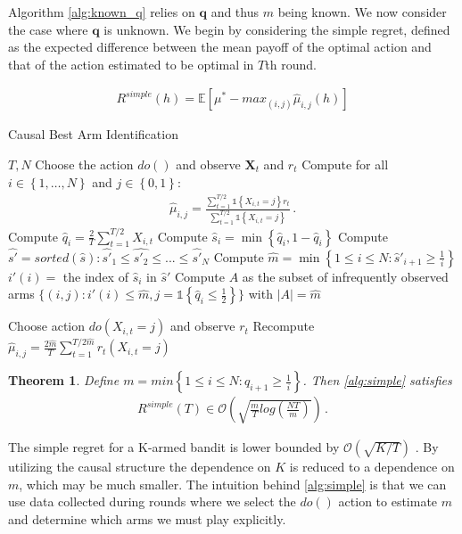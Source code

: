 \documentclass{article}
\newcommand{\E}[1]{\mathbb E\left[#1\right]}
\newcommand{\set}[1]{\left\{#1\right\}}
\newcommand{\ind}[1]{\mathds{1}\!\!\set{#1}}
\newcommand{\eqn}[1]{\begin{align}#1\end{align}}
\newcommand{\eq}[1]{\begin{align*}#1\end{align*}}
\newcommand{\bigo}[1]{\mathcal{O}\left( #1 \right)}
\theoremstyle{plain}
\newtheorem{theorem}{Theorem}
\theoremstyle{definition}
\begin{document}
Algorithm \ref{alg:known_q} relies on $\boldsymbol{q}$ and thus $m$ being known. We now consider the case where $\boldsymbol{q}$ is unknown. We begin by considering the simple regret, defined as the expected difference between the mean payoff of the optimal action and that of the action estimated to be optimal in $T$th round. 

\eqn{
R^{simple}(h) = \E{\mu^* - max_{(i,j)}\hat{\mu}_{i,j}(h)}
}

\begin{algorithm}[h]
\caption{Causal Best Arm Identification}\label{alg:simple}
\begin{algorithmic}[1]
 $T, N$
\STATE Choose the action $do()$ and observe $\boldsymbol{X}_t$ and $r_t$
\ENDFOR
\STATE Compute for all $i \in \set{1,\ldots,N}$ and $j \in \set{0,1}$:
\eq{
\hat \mu_{i,j} = \frac{\sum_{t=1}^{T/2} \ind{X_{i,t} = j} r_t}{\sum_{t=1}^{T/2} \ind{X_{i,t} = j}}\,.
}
\STATE Compute $\hat q_i = \frac{2}{T} \sum_{t=1}^{T/2} X_{i,t}$
\STATE Compute $\hat s_i = \min\set{\hat q_i, 1 - \hat q_i}$
\STATE Compute $\hat{s'} = sorted(\hat{s}) : \hat{s'}_1 \leq \hat{s'_2} \leq ... \leq \hat{s'}_N$
\STATE Compute $\hat m = \min\set{1 \leq i \leq N : \hat s'_{i+1} \geq \frac{1}{i}}$
\STATE $i'(i) = $ the index of $\hat s_i$ in $\hat s'$
\STATE Compute $A$ as the subset of infrequently observed arms $\{(i,j):i'(i) \leq \hat m, j = \ind{\hat q_{i} \leq \frac{1}{2}} \}$ with $|A| = \hat m$

\STATE Choose action $do(X_{i,t} = j)$ and observe $r_t$
\ENDFOR
\STATE Recompute $\hat \mu_{i,j} = \frac{2\hat m}{T} \sum_{t=1}^{ T/2\hat m} r_t(X_{i,t}=j)$ 
\ENDFOR
\end{algorithmic}
\end{algorithm}

\begin{theorem}\label{thm:unknown_q_simpleregret}
Define $m =   min\set{1 \leq i \leq N:q_{i+1} \geq \frac{1}{i}}$.
Then \cref{alg:simple} satisfies
\eq{
R^{simple}(T) \in \bigo{\sqrt{\frac{m}{T}log\left(\frac{NT}{m}\right)}}\,.
}
\end{theorem}

The simple regret for a K-armed bandit is lower bounded by $\bigo{\sqrt{K/T}}$ \cite{Bubeck2009}. By utilizing the causal structure the dependence on $K$ is reduced to a dependence on $m$, which may be much smaller. The intuition behind \cref{alg:simple} is that we can use data collected during rounds where we select the $do()$ action to estimate $m$ and determine which arms we must play explicitly. 
\end{document}
